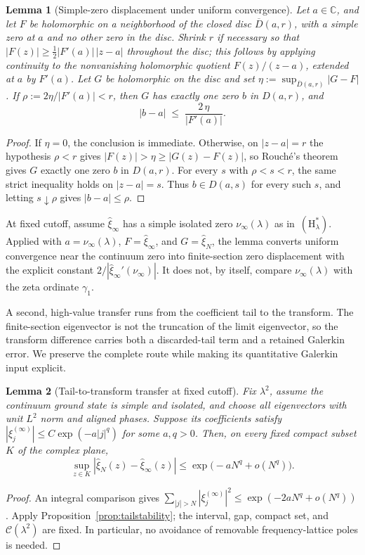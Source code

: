 \documentclass[11pt,a4paper]{article}
\newtheorem{lemma}{Lemma}
\begin{document}
\begin{lemma}[Simple-zero displacement under uniform convergence]\label{lem:rouche}
Let $a\in\mathbb C$, and let $F$ be holomorphic on a neighborhood of the closed
disc $\overline{D}(a,r)$, with a simple zero at $a$ and no other zero in the
disc. Shrink $r$ if necessary so that
$|F(z)|\ge\tfrac12|F'(a)|\,|z-a|$ throughout the disc; this follows by applying
continuity to the nonvanishing holomorphic quotient $F(z)/(z-a)$, extended at
$a$ by $F'(a)$. Let $G$ be holomorphic on the disc and set
$\eta:=\sup_{\overline{D}(a,r)}|G-F|$. If
$\rho:=2\eta/|F'(a)|<r$, then $G$ has exactly one zero $b$ in $D(a,r)$, and
\[
  |b-a|\;\le\;\frac{2\,\eta}{|F'(a)|}.
\]
\end{lemma}
\begin{proof}
If $\eta=0$, the conclusion is immediate. Otherwise, on $|z-a|=r$ the
hypothesis $\rho<r$ gives $|F(z)|>\eta\ge|G(z)-F(z)|$, so Rouch\'e's theorem
gives $G$ exactly one zero $b$ in $D(a,r)$. For every $s$ with
$\rho<s<r$, the same strict inequality holds on $|z-a|=s$. Thus $b\in D(a,s)$
for every such $s$, and letting $s\downarrow\rho$ gives $|b-a|\le\rho$.
\end{proof}

At fixed cutoff, assume $\widehat\xi_\infty$ has a simple isolated zero
$\nu_\infty(\lambda)$ as in~$(\mathrm{H}_\lambda^\ast)$. Applied with
$a=\nu_\infty(\lambda)$, $F=\widehat\xi_\infty$, and
$G=\widehat\xi_N$, the lemma converts uniform convergence near the continuum
zero into finite-section zero displacement with the explicit constant
$2/|\widehat\xi_\infty'(\nu_\infty)|$. It does not, by itself, compare
$\nu_\infty(\lambda)$ with the zeta ordinate $\gamma_1$.



A second, high-value transfer runs from the coefficient tail to the transform.
The finite-section eigenvector is not the truncation of the limit eigenvector,
so the transform difference carries both a discarded-tail term and a retained
Galerkin error. We preserve the complete route while making its quantitative
Galerkin input explicit.

\begin{lemma}[Tail-to-transform transfer at fixed cutoff]\label{lem:tail}
Fix $\lambda^2$, assume the continuum ground state is simple and isolated,
and choose all eigenvectors with unit $L^2$ norm and aligned phases.
Suppose its coefficients satisfy
$|\xi^{(\infty)}_j|\le C\exp(-a|j|^q)$ for some $a,q>0$.
Then, on every fixed compact subset $K$ of the complex plane,
\[
 \sup_{z\in K}|\widehat\xi_N(z)-\widehat\xi_\infty(z)|
 \le \exp\bigl(-aN^q+o(N^q)\bigr).
\]
\end{lemma}
\begin{proof}
An integral comparison gives
$\sum_{|j|>N}|\xi^{(\infty)}_j|^2
\le\exp(-2aN^q+o(N^q))$. Apply
Proposition~\ref{prop:tailstability}; the interval, gap, compact set,
and $\mathcal C(\lambda^2)$ are fixed. In particular, no avoidance of
removable frequency-lattice poles is needed.
\end{proof}
\end{document}
